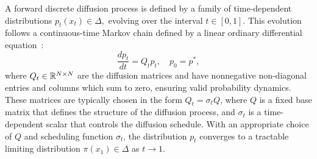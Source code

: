   A forward discrete diffusion process is defined by a family of time-dependent distributions $p_t(x_t) \in \Delta,$ evolving over the interval $t \in [0, 1].$ This evolution follows a continuous-time Markov chain defined by a linear ordinary differential equation~\citep{anderson2012continuous, campbell2022continuous, lou2024discrete}:
  \begin{equation}
    \frac{dp_t}{dt} = Q_t p_t, \quad p_0 = p^*,
  \label{eq:forward diffusion}
  \end{equation}
  where $Q_t \in \mathbb{R}^{N \times N}$ are the diffusion matrices and have nonnegative non-diagonal entries and columns which sum to zero, ensuring valid probability dynamics. These matrices are typically chosen in the form $Q_t = \sigma_t Q$, where $Q$ is a fixed base matrix that defines the structure of the diffusion process, and $\sigma_t$ is a time-dependent scalar that controls the diffusion schedule. With an appropriate choice of $Q$ and scheduling function $\sigma_t$, the distribution $p_t$ converges to a tractable limiting distribution $\pi(x_1) \in \Delta$ as $t \to 1$.


